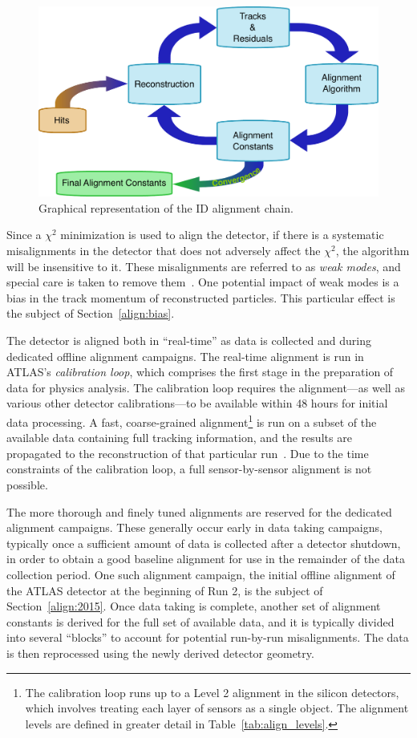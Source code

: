 \begin{figure}[htbp]
  \centering
  \includegraphics[width=.8\textwidth]{figs/alignment/alignment-chain}
  \caption{Graphical representation of the ID alignment chain.}
  \label{fig:alignment_chain}
\end{figure}

Since a $\chi^2$ minimization is used to align the detector, if there is a systematic misalignments in the detector that does not adversely affect the $\chi^2$, the algorithm will be insensitive to it.
These misalignments are referred to as \emph{weak modes}, and special care is taken to remove them~\cite{2014.alignment-performance-8tev}.
One potential impact of weak modes is a bias in the track momentum of reconstructed particles.
This particular effect is the subject of Section~\ref{align:bias}.

The detector is aligned both in ``real-time'' as data is collected and during dedicated offline alignment campaigns.
The real-time alignment is run in ATLAS's \emph{calibration loop}, which comprises the first stage in the preparation of data for physics analysis.
The calibration loop requires the alignment---as well as various other detector calibrations---to be available within 48 hours for initial data processing.
A fast, coarse-grained alignment\footnote{The calibration loop runs up to a Level 2 alignment in the silicon detectors, which involves treating each layer of sensors as a single object. The alignment levels are defined in greater detail in Table~\ref{tab:align_levels}.} is run on a subset of the available data containing full tracking information, and the results are propagated to the reconstruction of that particular run~\cite{2015.alignment-run-2-proceedings}.
Due to the time constraints of the calibration loop, a full sensor-by-sensor alignment is not possible.

The more thorough and finely tuned alignments are reserved for the dedicated alignment campaigns.
These generally occur early in data taking campaigns, typically once a sufficient amount of data is collected after a detector shutdown, in order to obtain a good baseline alignment for use in the remainder of the data collection period.
One such alignment campaign, the initial offline alignment of the ATLAS detector at the beginning of Run 2, is the subject of Section~\ref{align:2015}.
Once data taking is complete, another set of alignment constants is derived for the full set of available data, and it is typically divided into several ``blocks'' to account for potential run-by-run misalignments.
The data is then reprocessed using the newly derived detector geometry.

